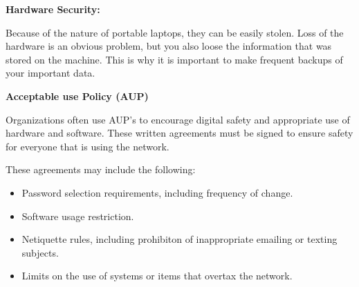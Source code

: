 \documentclass{report}
\begin{document}
    \bigbreak \noindent 

    \bigbreak \noindent \bigbreak \noindent \bigbreak \noindent 
    \begin{Large}
        \textbf{Hardware Security:}
    \end{Large}

    \bigbreak \noindent 
    Because of the nature of portable laptops, they can be easily stolen. 
    Loss of the hardware is an obvious problem, but you also loose the information 
    that was stored on the machine. This is why it is important to make frequent backups 
    of your important data.

    \bigbreak \noindent 

    \bigbreak \noindent \bigbreak \noindent \bigbreak \noindent 
    \begin{Large}
        \textbf{Acceptable use Policy (AUP)}
    \end{Large}
    
    \bigbreak \noindent 
    Organizations often use AUP's to encourage digital safety and appropriate use of hardware and software.
    These written agreements must be signed to ensure safety for everyone that is using the network.

    \bigbreak \noindent 
    These agreements may include the following:
    
    \bigbreak \noindent 
    \begin{itemize}
        \item Password selection requirements, including frequency of change.
        \item Software usage restriction.
        \item Netiquette rules, including prohibiton of inappropriate emailing or texting subjects.
        \item Limits on the use of systems or items that overtax the network.
    \end{itemize}
\end{document}
